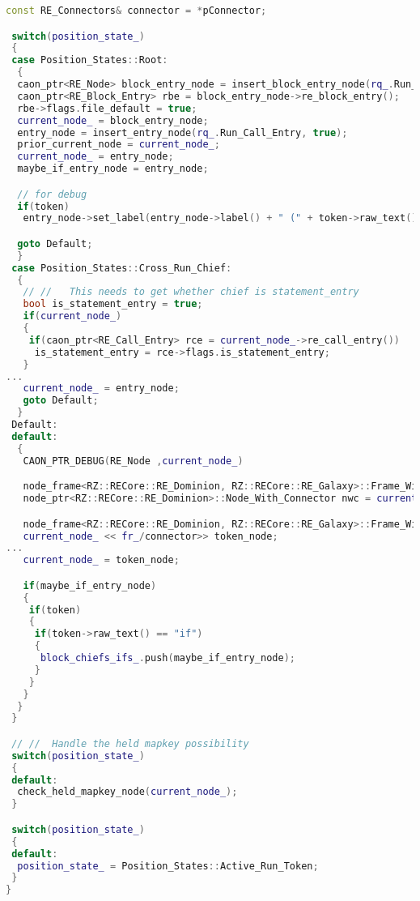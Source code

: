 \begin{lstlisting}[language = C++, numbers = none, 
caption={Hypergraph Modification Code},label={lst:figAddToken}, 
    basicstyle = \ttfamily\bfseries\scriptsize, linewidth = .9\linewidth]
 const RE_Connectors& connector = *pConnector;

 switch(position_state_)
 {
 case Position_States::Root:
  {
  caon_ptr<RE_Node> block_entry_node = insert_block_entry_node(rq_.Run_Block_Entry);
  caon_ptr<RE_Block_Entry> rbe = block_entry_node->re_block_entry();
  rbe->flags.file_default = true;
  current_node_ = block_entry_node;
  entry_node = insert_entry_node(rq_.Run_Call_Entry, true);
  prior_current_node = current_node_;
  current_node_ = entry_node;
  maybe_if_entry_node = entry_node;

  // for debug
  if(token)
   entry_node->set_label(entry_node->label() + " (" + token->raw_text() + ")");

  goto Default;
  }
 case Position_States::Cross_Run_Chief:
  {
   // //   This needs to get whether chief is statement_entry
   bool is_statement_entry = true;
   if(current_node_)
   {
    if(caon_ptr<RE_Call_Entry> rce = current_node_->re_call_entry())
     is_statement_entry = rce->flags.is_statement_entry;
   }
...
   current_node_ = entry_node;
   goto Default;
  }
 Default:
 default:
  {
   CAON_PTR_DEBUG(RE_Node ,current_node_)

   node_frame<RZ::RECore::RE_Dominion, RZ::RECore::RE_Galaxy>::Frame_With_Connector fwc = fr_/connector;
   node_ptr<RZ::RECore::RE_Dominion>::Node_With_Connector nwc = current_node_ << fwc;

   node_frame<RZ::RECore::RE_Dominion, RZ::RECore::RE_Galaxy>::Frame_With_Connector fwc1 = nwc.frame_with_connector;
   current_node_ << fr_/connector>> token_node;
...
   current_node_ = token_node;

   if(maybe_if_entry_node)
   {
    if(token)
    {
     if(token->raw_text() == "if")
     {
      block_chiefs_ifs_.push(maybe_if_entry_node);
     }
    }
   }
  }
 }

 // //  Handle the held mapkey possibility
 switch(position_state_)
 {
 default:
  check_held_mapkey_node(current_node_);
 }

 switch(position_state_)
 {
 default:
  position_state_ = Position_States::Active_Run_Token;
 }
}


\end{lstlisting}
